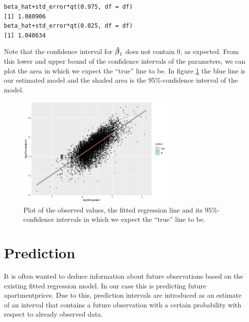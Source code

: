 \begin{example} 
\begin{lstlisting}
beta_hat+std_error*qt(0.975, df = df)
[1] 1.080906
beta_hat+std_error*qt(0.025, df = df)
[1] 1.040634
\end{lstlisting}

Note that the confidence interval for $\operatorname{\boldsymbol{\hat{\beta}}}_1$ does not contain 0, as expected.
From this lower and upper bound of the confidence intervals of the parameters, we can plot the area in which we expect the ``true'' line to be. 
In figure \ref{fig:t_distributionplot2} the blue line is our estimated model and the shaded area is the 95\%-confidence interval of the model. 
\begin{figure}[H]
    \centering
    \includegraphics[width = 0.7\textwidth]{figures/Nanna/Confidence_interval.pdf}
    \caption{Plot of the observed values, the fitted regression line and its $95\%$-confidence intervals in which we expect the ``true'' line to be.}
    \label{fig:t_distributionplot2}
\end{figure}
\end{example}

\section{Prediction}
It is often wanted to deduce information about future observations based on the existing fitted regression model. 
In our case this is predicting future apartmentprices. 
Due to this, prediction intervals are introduced as an estimate of an interval that contains a future observation with a certain probability with respect to already observed data.

